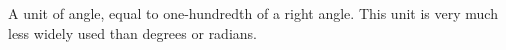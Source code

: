  A unit of angle, equal to one-hundredth of a right angle. This unit
is very much less widely used than degrees or radians.